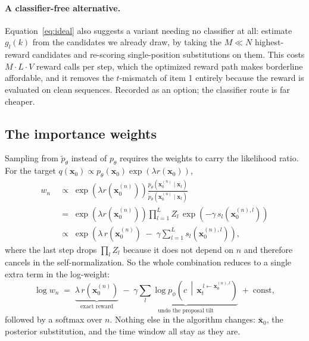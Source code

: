 \documentclass[11pt]{article}
\newcommand{\x}{\mathbf{x}}
\begin{document}
\paragraph{A classifier-free alternative.} Equation~\eqref{eq:ideal} also
suggests a variant needing no classifier at all: estimate $g_l(k)$ from the
candidates we already draw, by taking the $M \ll N$ highest-reward candidates
and re-scoring single-position substitutions on them. This costs $M \cdot L
\cdot V$ reward calls per step, which the optimized reward path makes borderline
affordable, and it removes the $t$-mismatch of item 1 entirely because the
reward is evaluated on clean sequences. Recorded as an option; the classifier
route is far cheaper.

\subsection{The importance weights}

Sampling from $\tilde{p}_\theta$ instead of $p_\theta$ requires the weights to
carry the likelihood ratio. For the target
$q(\x_0) \propto p_\theta(\x_0)\exp(\lambda r(\x_0))$,
\begin{align}
w_n
&\;\propto\; \exp\!\left(\lambda r(\x_0^{(n)})\right)
   \frac{p_\theta(\x_0^{(n)} \mid \x_t)}{\tilde{p}_\theta(\x_0^{(n)} \mid \x_t)}
\label{eq:w1}\\[2pt]
&\;=\; \exp\!\left(\lambda r(\x_0^{(n)})\right)
   \prod_{l=1}^{L} Z_l \,
   \exp\!\left(-\gamma\, s_l\!\left(\x_0^{(n),l}\right)\right)
\label{eq:w2}\\[2pt]
&\;\propto\; \exp\!\left(
   \lambda\, r(\x_0^{(n)})
   \;-\; \gamma \sum_{l=1}^{L} s_l\!\left(\x_0^{(n),l}\right)
 \right),
\label{eq:w3}
\end{align}
where the last step drops $\prod_l Z_l$ because it does not depend on $n$ and
therefore cancels in the self-normalization. So the whole combination reduces
to a single extra term in the log-weight:
\begin{equation}
\boxed{\;
\log w_n \;=\; \underbrace{\lambda\, r(\x_0^{(n)})}_{\text{exact reward}}
  \;-\; \underbrace{\gamma \sum_{l} \log p_\phi\!\left(c \,\middle|\,
        \x_t^{\,l \leftarrow \x_0^{(n),l}}\right)}_{\text{undo the proposal tilt}}
  \;+\; \text{const},
\;}
\label{eq:final}
\end{equation}
followed by a softmax over $n$. Nothing else in the algorithm changes:
$\bar{\x}_0$, the posterior substitution, and the time window all stay as they
are.
\end{document}
